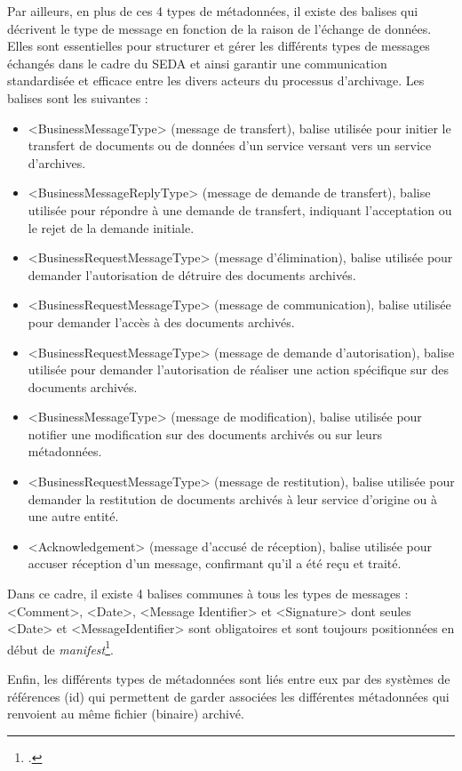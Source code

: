 Par ailleurs, en plus de ces 4 types de métadonnées, il existe des balises qui décrivent le type de message en fonction de la raison de l’échange de données. Elles sont essentielles pour structurer et gérer les différents types de messages échangés dans le cadre du \gls{SEDA} et ainsi garantir une communication standardisée et efficace entre les divers acteurs du processus d'archivage. Les balises sont les suivantes : 
\begin{itemize}
	\item <BusinessMessageType> (message de transfert), balise utilisée pour initier le transfert de documents ou de données d'un service versant vers un service d'archives.
	\item <BusinessMessageReplyType> (message de demande de transfert), balise utilisée pour répondre à une demande de transfert, indiquant l'acceptation ou le rejet de la demande initiale.
	\item <BusinessRequestMessageType> (message d'élimination), balise utilisée pour demander l'autorisation de détruire des documents archivés.
	\item <BusinessRequestMessageType> (message de communication), balise utilisée pour demander l'accès à des documents archivés.
	\item <BusinessRequestMessageType> (message de demande d’autorisation), balise utilisée pour demander l'autorisation de réaliser une action spécifique sur des documents archivés.
	\item <BusinessMessageType> (message de modification), balise utilisée pour notifier une modification sur des documents archivés ou sur leurs métadonnées.
	\item <BusinessRequestMessageType> (message de restitution), balise utilisée pour demander la restitution de documents archivés à leur service d'origine ou à une autre entité.
	\item <Acknowledgement> (message d'accusé de réception), balise utilisée pour accuser réception d'un message, confirmant qu'il a été reçu et traité.
\end{itemize}


Dans ce cadre, il existe 4 balises communes à tous les types de messages : <Comment>, <Date>, <Message Identifier> et <Signature> dont seules <Date> et <MessageIdentifier> sont obligatoires et sont toujours positionnées en début de \textit{\gls{manifest}}\footcite[pp.43-45]{siaf_dictionnaire_2022}.


Enfin, les différents types de métadonnées sont liés entre eux par des systèmes de références (id) qui permettent de garder associées les différentes métadonnées qui renvoient au même fichier (binaire) archivé. 

